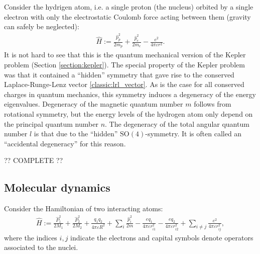     Consider the hydrigen atom, i.e. a single proton (the nucleus) orbited by a single electron with only the electrostatic Coulomb force acting between them (gravity can safely be neglected):
    \begin{gather}
        \hat{H} := \frac{\hat{p}_p^2}{2m_p} + \frac{\hat{p}_e^2}{2m_e} - \frac{e^2}{4\pi\varepsilon r^2}.
    \end{gather}
    It is not hard to see that this is the quantum mechanical version of the Kepler problem (Section \ref{section:kepler}). The special property of the Kepler problem was that it contained a ``hidden'' symmetry that gave rise to the conserved Laplace-Runge-Lenz vector \ref{classic:lrl_vector}. As is the case for all conserved charges in quantum mechanics, this symmetry induces a degeneracy of the energy eigenvalues. Degeneracy of the magnetic quantum number $m$ follows from rotational symmetry, but the energy levels of the hydrogen atom only depend on the principal quantum number $n$. The degeneracy of the total angular quantum number $l$ is that due to the ``hidden'' $\mathrm{SO}(4)$-symmetry. It is often called an ``accidental degeneracy'' for this reason.

    ?? COMPLETE ??

\subsection{Molecular dynamics}

    Consider the Hamiltonian of two interacting atoms:
    \begin{gather}
        \hat{H} := \frac{\hat{P}_1^2}{2M_1} + \frac{\hat{P}_2^2}{2M_2} + \frac{q_1q_2}{4\pi\varepsilon R^2} + \sum_i\frac{\hat{p}_i^2}{2m} - \frac{eq_1}{4\pi\varepsilon r_{i1}^2} - \frac{eq_2}{4\pi\varepsilon r_{i2}^2} + \sum_{i\neq j}\frac{e^2}{4\pi\varepsilon r_{ij}^2},
    \end{gather}
    where the indices $i,j$ indicate the electrons and capital symbols denote operators associated to the nuclei.

